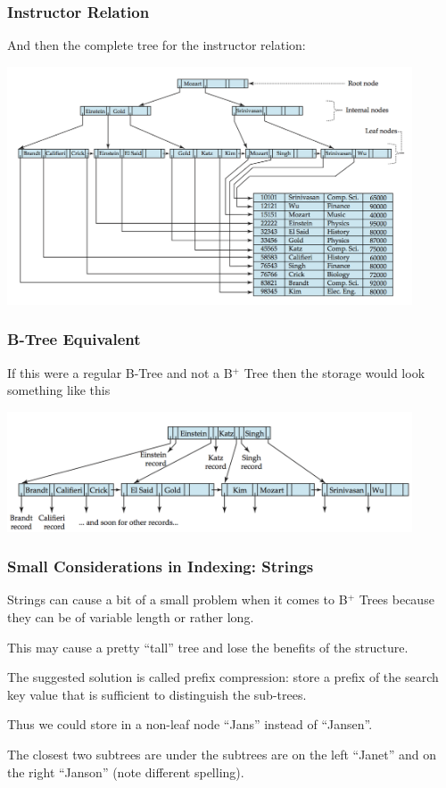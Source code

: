 \begin{frame}
\frametitle{Instructor Relation}

And then the complete tree for the instructor relation:

\begin{center}
	\includegraphics[width=0.9\textwidth]{images/b-tree-complete}
\end{center}

\end{frame}



\begin{frame}
\frametitle{B-Tree Equivalent}

If this were a regular B-Tree and not a B$^{+}$ Tree then the storage would look something like this

\begin{center}
	\includegraphics[width=0.9\textwidth]{images/b-tree-equivalent}
\end{center}

\end{frame}

\begin{frame}
\frametitle{Small Considerations in Indexing: Strings}

Strings can cause a bit of a small problem when it comes to B$^{+}$ Trees because they can be of variable length or rather long. 

This may cause a pretty ``tall'' tree and lose the benefits of the structure. 

The suggested solution is called prefix compression: store a prefix of the search key value that is sufficient to distinguish the sub-trees. 

Thus we could store in a non-leaf node ``Jans'' instead of ``Jansen''. 

The closest two subtrees are under the subtrees are on the left ``Janet'' and on the right ``Janson'' (note different spelling).

\end{frame}

